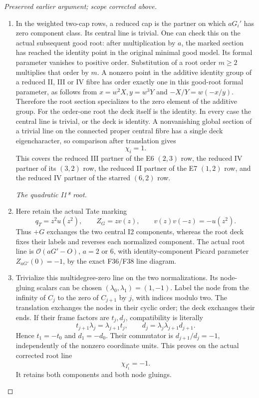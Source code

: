 \begin{proof}[Preserved earlier argument; scope corrected above]
\begin{enumerate}[label=\arabic*.]
\par\smallskip\noindent\textit{Reduced partners with the component class killed by a.}\enspace

\item In the weighted two-cap rows, a reduced cap is the partner on
which \(aG_i'\) has zero component class. Its central line is
trivial. One can check this on the actual subsequent good root:
after multiplication by \(a\), the marked section has reached
the identity point in the original minimal good model. Its
formal parameter vanishes to positive order. Substitution of a
root order \(m\ge2\) multiplies that order by \(m\). A nonzero
point in the additive identity group of a reduced II, III or IV
fibre has order exactly one in this good-root formal parameter,
as follows from \(x=w^2X,y=w^3Y\) and
\(-X/Y=w(-x/y)\). Therefore the root section specializes to
the zero element of the additive group. For the order-one root
the deck itself is the identity. In every case the central line
is trivial, or the deck is identity. A nonvanishing global
section of a trivial line on the connected proper central fibre
has a single deck eigencharacter, so comparison after translation
gives
\[
                              \chi_i=1.                 \tag{P3K.35.11}
\]
This covers the reduced III partner of the E6 \((2,3)\) row,
the reduced IV partner of its \((3,2)\) row, the reduced II
partner of the E7 \((1,2)\) row, and the reduced IV partner
of the starred \((6,2)\) row.

\par\smallskip\noindent\textit{The quadratic I1* root.}\enspace

\item Here retain the actual Tate marking
\[
 q_T=z^2u(z^2),\qquad Z_G=zv(z),\qquad
 v(z)v(-z)=-u(z^2).
\]
Thus \(+G\) exchanges the two central I2 components, whereas
the root deck fixes their labels and reverses each normalized
component. The actual root line is \(\mathcal O(aG'-O)\),
\(a=2\) or \(6\), with identity-component Picard parameter
\(Z_{aG'}(0)=-1\), by the exact F36/F38 line diagram.

\item Trivialize this multidegree-zero line on the two normalizations.
Its node-gluing scalars can be chosen \((\lambda_0,\lambda_1)
=(1,-1)\). Label the node from the infinity of \(C_j\) to
the zero of \(C_{j+1}\) by \(j\), with indices modulo two.
The translation exchanges the nodes in their cyclic order;
the deck exchanges their ends. If their frame factors are
\(t_j,d_j\), compatibility is literally
\[
 t_{j+1}\lambda_j=\lambda_{j+1}t_j,\qquad
 d_j=\lambda_j\lambda_{j+1}d_{j+1}.
\]
Hence \(t_1=-t_0\) and \(d_1=-d_0\). Their commutator is
\(d_{j+1}/d_j=-1\), independently of the nonzero coordinate
units. This proves on the actual corrected root line
\[
                         \chi_{I_1^*}=-1.              \tag{P3K.35.12}
\]
It retains both components and both node gluings.


\end{enumerate}
\end{proof}
